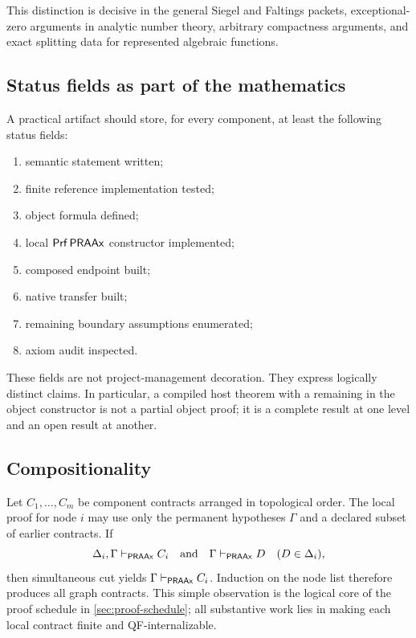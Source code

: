 This distinction is decisive in the general Siegel and Faltings packets, exceptional-
zero arguments in analytic number theory, arbitrary compactness arguments, and exact
splitting data for represented algebraic functions.

\subsection{Status fields as part of the mathematics}

A practical artifact should store, for every component, at least the following status
fields:

\begin{enumerate}[label=\arabic*.,leftmargin=2.2em]
\item semantic statement written;
\item finite reference implementation tested;
\item object formula defined;
\item local \(\mathsf{Prf}\,\mathsf{PRAAx}\) constructor implemented;
\item composed endpoint built;
\item native transfer built;
\item remaining boundary assumptions enumerated;
\item axiom audit inspected.
\end{enumerate}

These fields are not project-management decoration.  They express logically distinct
claims.  In particular, a compiled host theorem with a remaining  in the
object constructor is not a partial object proof; it is a complete result at one level
and an open result at another.

\subsection{Compositionality}

Let \(C_1,\ldots,C_m\) be component contracts arranged in topological order.  The local
proof for node \(i\) may use only the permanent hypotheses \(\Gamma\) and a declared
subset of earlier contracts.  If
\[
   \Delta_i,\Gamma\vdash_{\mathsf{PRAAx}} C_i
   \quad\text{and}\quad
   \Gamma\vdash_{\mathsf{PRAAx}}D\quad(D\in\Delta_i),
\]
then simultaneous cut yields \(\Gamma\vdash_{\mathsf{PRAAx}}C_i\).  Induction on the node list
therefore produces all graph contracts.  This simple observation is the logical core
of the proof schedule in \cref{sec:proof-schedule}; all substantive work lies in
making each local contract finite and QF-internalizable.
